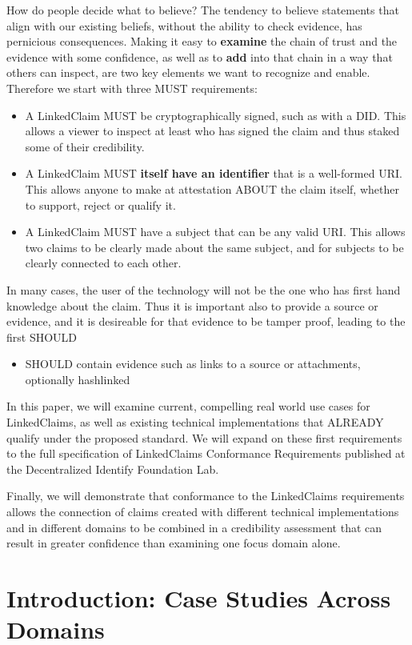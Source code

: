 \documentclass[11pt]{article}
\begin{document}
How do people decide what to believe?  The tendency to believe statements that align with our existing beliefs, without the ability to check evidence, has pernicious consequences.  Making it easy to \textbf{examine} the chain of trust and the evidence with some confidence, as well as to \textbf{add} into that chain in a way that others can inspect, are two key elements we want to recognize and enable.  Therefore we start with three MUST requirements: 
\begin{itemize}
    \item A LinkedClaim MUST be cryptographically signed, such as with a DID.  This allows a viewer to inspect at least who has signed the claim and thus staked some of their credibility.
    \item A LinkedClaim MUST \textbf{itself have an identifier} that is a well-formed URI.  This allows anyone to make at attestation ABOUT the claim itself, whether to support, reject or qualify it.
    \item A LinkedClaim MUST have a subject that can be any valid URI.  This allows two claims to be clearly made about the same subject, and for subjects to be clearly connected to each other.
\end{itemize}
In many cases, the user of the technology will not be the one who has first hand knowledge about the claim.  Thus it is important also to provide a source or evidence, and it is desireable for that evidence to be tamper proof, leading to the first SHOULD
\begin{itemize}
    \item SHOULD contain evidence such as links to a source or attachments, optionally hashlinked
\end{itemize}
In this paper, we will examine current, compelling real world use cases for LinkedClaims, as well as existing technical implementations that ALREADY qualify under the proposed standard. We will expand on these first requirements to the full specification of LinkedClaims Conformance Requirements published at the Decentralized Identify Foundation Lab.

Finally, we will demonstrate that conformance to the LinkedClaims requirements allows the connection of claims created with different technical implementations and in different domains to be combined in a credibility assessment that can result in greater confidence than examining one focus domain alone.

\section{Introduction: Case Studies Across Domains}
\end{document}
